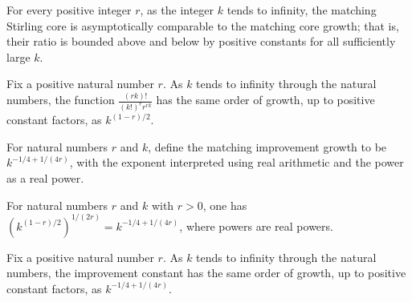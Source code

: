 \begin{theorem}
\label{FABL.matchingStirlingCore_isTheta_growth}
\leanok
{}
For every positive integer $r$, as the integer $k$ tends to infinity, the matching
Stirling core is asymptotically comparable to the matching core growth; that is, their
ratio is bounded above and below by positive constants for all sufficiently large $k$.
\end{theorem}

\begin{theorem}
\label{FABL.matchingFactorialRatio_isTheta_growth}
\leanok
{}
Fix a positive natural number $r$. As $k$ tends to infinity through the natural numbers,
the function $\frac{(rk)!}{(k!)^r r^{rk}}$ has the same order of growth, up to positive
constant factors, as $k^{(1-r)/2}$.
\end{theorem}

\begin{definition}
\label{FABL.matchingImprovementGrowth}
\leanok
For natural numbers $r$ and $k$, define the matching improvement growth to be
$k^{-1/4+1/(4r)}$, with the exponent interpreted using real arithmetic and the power as
a real power.
\end{definition}

\begin{theorem}
\label{FABL.matchingCoreGrowth_rpow_eq_improvementGrowth}
\leanok
{}
For natural numbers $r$ and $k$ with $r>0$, one has
$\left(k^{(1-r)/2}\right)^{1/(2r)}=k^{-1/4+1/(4r)}$, where powers are real powers.
\end{theorem}

\begin{theorem}
\label{FABL.matchingImprovementConstant_isTheta}
\leanok
{}
Fix a positive natural number $r$. As $k$ tends to infinity through the natural numbers,
the improvement constant has the same order of growth, up to positive constant factors,
as $k^{-1/4+1/(4r)}$.
\end{theorem}
